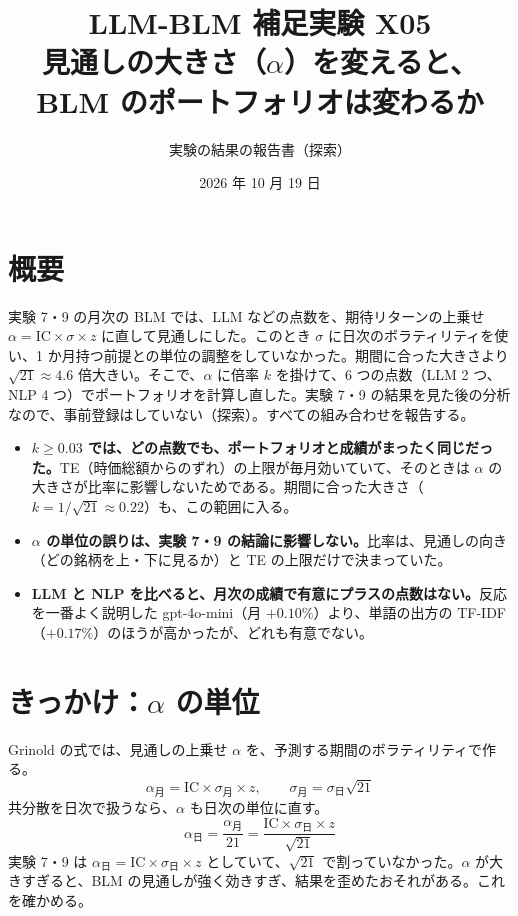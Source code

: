 \documentclass[xelatex,ja=standard,jafont=haranoaji,a4paper,10pt,openany]{bxjsreport}
\title{LLM-BLM 補足実験 X05\\[6pt]
  \large 見通しの大きさ（$\alpha$）を変えると、\\BLM のポートフォリオは変わるか}
\author{実験の結果の報告書（探索）}
\date{2026 年 10 月 19 日}
\begin{document}
\maketitle

\chapter*{概要}

実験 7・9 の月次の BLM では、LLM などの点数を、期待リターンの上乗せ $\alpha = \mathrm{IC}\times\sigma\times z$ に直して見通しにした。このとき $\sigma$ に日次のボラティリティを使い、1 か月持つ前提との単位の調整をしていなかった。期間に合った大きさより $\sqrt{21}\approx4.6$ 倍大きい。そこで、$\alpha$ に倍率 $k$ を掛けて、6 つの点数（LLM 2 つ、NLP 4 つ）でポートフォリオを計算し直した。実験 7・9 の結果を見た後の分析なので、事前登録はしていない（探索）。すべての組み合わせを報告する。

\begin{keybox}[主な結論]
\begin{itemize}
\item \textbf{$k\geq0.03$ では、どの点数でも、ポートフォリオと成績がまったく同じだった。}TE（時価総額からのずれ）の上限が毎月効いていて、そのときは $\alpha$ の大きさが比率に影響しないためである。期間に合った大きさ（$k=1/\sqrt{21}\approx0.22$）も、この範囲に入る。
\item \textbf{$\alpha$ の単位の誤りは、実験 7・9 の結論に影響しない。}比率は、見通しの向き（どの銘柄を上・下に見るか）と TE の上限だけで決まっていた。
\item \textbf{LLM と NLP を比べると、月次の成績で有意にプラスの点数はない。}反応を一番よく説明した gpt-4o-mini（月 $+0.10\%$）より、単語の出方の TF-IDF（$+0.17\%$）のほうが高かったが、どれも有意でない。
\end{itemize}
\end{keybox}

\setcounter{tocdepth}{1}
{\small\tableofcontents}

\chapter{きっかけ：$\alpha$ の単位}\label{ch:intro}

Grinold の式では、見通しの上乗せ $\alpha$ を、予測する期間のボラティリティで作る。
\[
\alpha_{\text{月}} = \mathrm{IC}\times\sigma_{\text{月}}\times z,\qquad \sigma_{\text{月}}=\sigma_{\text{日}}\sqrt{21}
\]
共分散を日次で扱うなら、$\alpha$ も日次の単位に直す。
\[
\alpha_{\text{日}} = \frac{\alpha_{\text{月}}}{21} = \frac{\mathrm{IC}\times\sigma_{\text{日}}\times z}{\sqrt{21}}
\]
実験 7・9 は $\alpha_{\text{日}}=\mathrm{IC}\times\sigma_{\text{日}}\times z$ としていて、$\sqrt{21}$ で割っていなかった。$\alpha$ が大きすぎると、BLM の見通しが強く効きすぎ、結果を歪めたおそれがある。これを確かめる。
\end{document}
